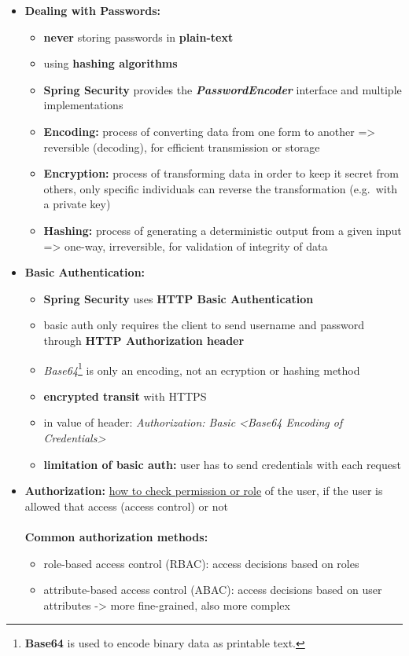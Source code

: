 \documentclass[ieeetran]{article}
\begin{document}
\begin{itemize}
\item \textbf{Dealing with Passwords:}
\begin{itemize}
  \item \textbf{never} storing passwords in \textbf{plain-text}
\item using \textbf{hashing algorithms}
\item \textbf{Spring Security} provides the \textit{\textbf{PasswordEncoder}} interface and multiple implementations
\item \textbf{Encoding:} process of converting data from one form to another => reversible (decoding), for efficient transmission or storage
\item \textbf{Encryption:} process of transforming data in order to keep it secret from others, only specific individuals can reverse the transformation (e.g.\ with a private key)
	\item \textbf{Hashing:} process of generating a deterministic output from a given input => one-way, irreversible, for validation of integrity of data
\end{itemize}

\pagebreak
\item \textbf{Basic Authentication:}
	\begin{itemize}
	  \item \textbf{Spring Security} uses \textbf{HTTP Basic Authentication}
	\item basic auth only requires the client to send username and password through \textbf{HTTP Authorization header}
	\item \textit{Base64}\footnote{\textbf{Base64} is used to encode binary data as printable text.} is only an encoding, not an ecryption or hashing method
	\item \textbf{encrypted transit} with HTTPS
	\item in value of header: \textit{Authorization: Basic <Base64 Encoding of Credentials>}
	\item \textbf{limitation of basic auth:} user has to send credentials with each request
	\end{itemize}

\item \textbf{Authorization:} \underline{how to check permission or role} of the user, if the user is allowed that access (access control) or not \\ \\
	\textbf{Common authorization methods:}
	\begin{itemize}
	  \item role-based access control (RBAC): access decisions based on roles
	\item attribute-based access control (ABAC): access decisions based on user attributes -> more fine-grained, also more complex
	\end{itemize}


\end{itemize}
\end{document}
